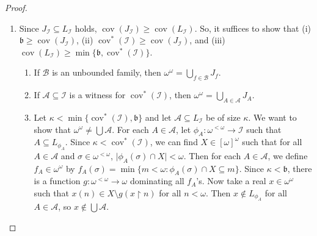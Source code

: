 \documentclass[a4paper,12pt]{amsart}
\theoremstyle{definition}
\numberwithin{thm}{section}
\numberwithin{equation}{section}
\newcommand{\bb}{\mathfrak{b}}
\DeclareMathOperator{\cov}{cov}
\newcommand{\I}{\mathscr{I}}
\renewcommand{\subset}{\subseteq}
\begin{document}
\begin{proof}
\begin{enumerate}
        \item Since $J_\I \subset L_\I$ holds, $\cov(J_\I)\geq\cov(L_\I)$. So, it suffices to show that (i) $\bb\geq\cov(J_\I)$, (ii) $\cov^*(\I)\geq\cov(J_\I)$, and (iii) $\cov(L_\I)\geq\min\{\bb, \cov^*(\I)\}$.
        \begin{enumerate}[label = (\roman*)]
            \item If $\mathcal{B}$ is an unbounded family, then $\omega^\omega = \bigcup_{f\in\mathcal{B}}J_f$.
            \item If $\mathcal{A}\subset\I$ is a witness for $\cov^*(\I)$, then $\omega^\omega = \bigcup_{A\in\mathcal{A}}J_A$.
            \item Let $\kappa < \min\{\cov^*(\I), \bb\}$ and let $\mathcal{A}\subset L_\I$ be of size $\kappa$. We want to show that $\omega^\omega\neq\bigcup\mathcal{A}$. For each $A\in\mathcal{A}$, let $\phi_A\colon\omega^{<\omega}\to\I$ such that $A\subset L_{\phi_A}$. Since $\kappa<\cov^*(\I)$, we can find $X\in[\omega]^\omega$ such that for all $A\in\mathcal{A}$ and $\sigma\in\omega^{<\omega}$, $\lvert \phi_A(\sigma)\cap X\rvert < \omega$. Then for each $A\in\mathcal{A}$, we define $f_A\in\omega^\omega$ by $f_A(\sigma) = \min\{m<\omega: \phi_A(\sigma)\cap X\subset m\}$. Since $\kappa < \bb$, there is a function $g\colon\omega^{<\omega}\to\omega$ dominating all $f_A$'s. Now take a real $x\in\omega^\omega$ such that $x(n)\in X\setminus g(x\upharpoonright n)$ for all $n<\omega$. Then $x\notin L_{\phi_A}$ for all $A\in\mathcal{A}$, so $x\notin\bigcup\mathcal{A}$.
        \end{enumerate}


\end{enumerate}
\end{proof}
\end{document}
